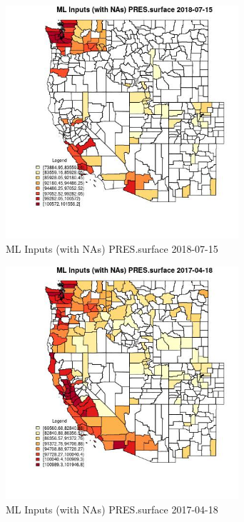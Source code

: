 \clearpage 

\begin{figure} 
\centering  
\includegraphics[width=0.77\textwidth]{Code_Outputs/Report_ML_input_PM25_Step4_part_e_de_duplicated_aves_compiled_2019-05-21wNAs_CountyPRESsurfaceMean2018-07-15.jpg} 
\caption{\label{fig:Report_ML_input_PM25_Step4_part_e_de_duplicated_aves_compiled_2019-05-21wNAsCountyPRESsurfaceMean2018-07-15}ML Inputs (with NAs) PRES.surface 2018-07-15} 
\end{figure} 
 

\begin{figure} 
\centering  
\includegraphics[width=0.77\textwidth]{Code_Outputs/Report_ML_input_PM25_Step4_part_e_de_duplicated_aves_compiled_2019-05-21wNAs_CountyPRESsurfaceMean2017-04-18.jpg} 
\caption{\label{fig:Report_ML_input_PM25_Step4_part_e_de_duplicated_aves_compiled_2019-05-21wNAsCountyPRESsurfaceMean2017-04-18}ML Inputs (with NAs) PRES.surface 2017-04-18} 
\end{figure} 
 

